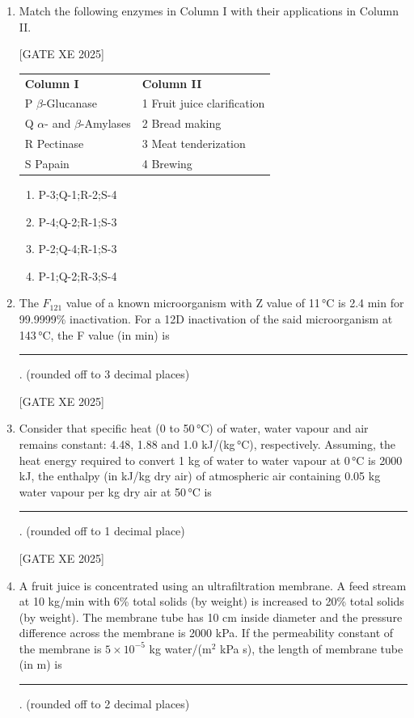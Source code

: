 \documentclass[journal,12pt,onecolumn]{IEEEtran}
\theoremstyle{remark}
\begin{document}
\begin{enumerate}
\item Match the following enzymes in Column I with their applications in Column II.

\hfill[GATE XE 2025]

\begin{center}
\begin{tabular}{l l}
\textbf{Column I} & \textbf{Column II} \\
P $\beta$-Glucanase & 1 Fruit juice clarification \\
Q $\alpha$- and $\beta$-Amylases & 2 Bread making \\
R Pectinase & 3 Meat tenderization \\
S Papain & 4 Brewing \\
\end{tabular}
\end{center}

\begin{multicols}{2}
\begin{enumerate}
\item P-3;Q-1;R-2;S-4
\item P-4;Q-2;R-1;S-3
\item P-2;Q-4;R-1;S-3
\item P-1;Q-2;R-3;S-4
\end{enumerate}
\end{multicols}

\item The $F_{121}$ value of a known microorganism with Z value of 11\,°C is 2.4 min for 99.9999\% inactivation. For a 12D inactivation of the said microorganism at 143\,°C, the F value (in min) is \rule{3cm}{0.15mm}. (rounded off to 3 decimal places)

\hfill[GATE XE 2025]

\item Consider that specific heat (0 to 50\,°C) of water, water vapour and air remains constant: 4.48, 1.88 and 1.0 kJ/(kg\,°C), respectively. Assuming, the heat energy required to convert 1 kg of water to water vapour at 0\,°C is 2000 kJ, the enthalpy (in kJ/kg dry air) of atmospheric air containing 0.05 kg water vapour per kg dry air at 50\,°C is \rule{3cm}{0.15mm}. (rounded off to 1 decimal place)

\hfill[GATE XE 2025]

\item A fruit juice is concentrated using an ultrafiltration membrane. A feed stream at 10 kg/min with 6\% total solids (by weight) is increased to 20\% total solids (by weight). The membrane tube has 10 cm inside diameter and the pressure difference across the membrane is 2000 kPa. If the permeability constant of the membrane is $5 \times 10^{-5}$ kg water/(m$^2$ kPa s), the length of membrane tube (in m) is \rule{3cm}{0.15mm}. (rounded off to 2 decimal places)


\end{enumerate}
\end{document}
